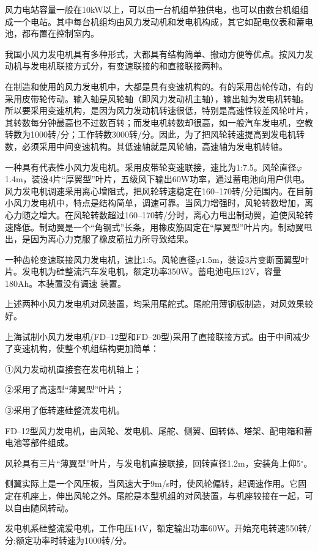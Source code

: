 \documentclass{ctexbook}
\begin{document}
风力电站容量一般在10kW以上，可以由一台机组单独供电，也可以由数台机组组成一个电站。其中每台机组均由风力发动机和发电机构成，其它如配电仪表和蓄电池，都布置在控制室内。

我国小风力发电机具有多种形式，大都具有结构简单、搬动方便等优点。按风力发动机与发电机联接方式分，有变速联接的和直接联接两种。

在制造和使用的风力发电机中，大都是具有变速机构的。有的采用齿轮传动，有的采用皮带轮传动。输入轴是风轮轴（即风力发动机主轴），输出轴为发电机转轴。所以要采用变速机构，是因为风力发动机转速很低，特别是高速性较差风轮叶片，其转数每分钟最高也不过数百转；而发电机转数却很高，如一般汽车发电机，空教转数为1000转/分；工作转数3000转/分。因此，为了把风轮转速提高到发电机转数，必须采用中间变速机构。其低速轴就是风轮轴，高速轴为发电机转轴。

一种具有代表性小风力发电机。采用皮带轮变速联接，速比为1:7.5。风轮直径$\varphi$1.4m，装设4片“厚翼型”叶片，五级风下输出60W功率，通过蓄电池向用户供电。风力发电机调速采用离心增阻式，把风轮转速稳定在160--170转/分范围内。在目前小风力发电机中，特点是结构简单，调速可靠。当风力增强时，风轮转数增加，离心力随之增大。在风轮转数超过160--170转/分时，离心力甩出制动翼，迫使风轮转速降低。制动翼是一个“角钢式”长条，用橡皮筋固定在“厚翼型”叶片内。制动翼甩出，是因为离心力克服了橡皮筋拉力所导致结果。

一种齿轮变速联接风力发电机，速比1:5。风轮直径$\varphi$1.5m，装设3片变断面翼型叶片。发电机为硅整流汽车发电机，额定功率350W。蓄电池电压12V，容量180Ah。本装置没有调速
装置。

上述两种小风力发电机对风装置，均采用尾舵式。尾舵用薄钢板制造，对风效果较好。

上海试制小风力发电机(FD--12型和FD--20型)采用了直接联接方式。由于中间减少了变速机构，使整个机组结构更加简单：

①风力发动机直接套在发电机轴上；

②采用了高速型“薄翼型”叶片；

③采用了低转速硅整流发电机。

FD--12型风力发电机，由风轮、发电机、尾舵、侧翼、回转体、塔架、配电箱和蓄电池等部件组成。

风轮具有三片“薄翼型”叶片，与发电机直接联接，回转直径1.2m，安装角上仰5$^{\circ}$。

侧翼实际上是一个风压板，当风速大于9m/s时，使风轮偏转，起调速作用。它固定在机座上，伸出风轮之外。尾舵是本型机组的对风装置，与机座较接在一起，可以自由随风转动。

发电机系硅整流爰电机，工作电压14V，额定输出功率60W。开始充电转速550转/分;额定功率时转速为1000转/分。
\end{document}
